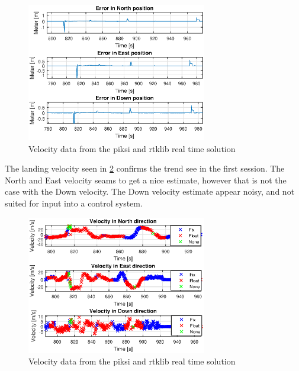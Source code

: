 \begin{figure}[H]
	\centering
		\includegraphics[width=0.7\textwidth]{figs/plots/landingErrorNorthEastDownFlight.eps}
		\caption{Velocity data from the piksi and rtklib real time solution}
		\label{figure:landingErrorNorthEastDownFlight}
\end{figure}
The landing velocity seen in \ref{figure:landingVelocity} confirms the trend see in the first session. The North and East velocity seams to get a nice estimate, however that is not the case with the Down velocity. The Down velocity estimate appear noisy, and not suited for input into a control system. 
\begin{figure}[H]
	\centering
		\includegraphics[width=0.7\textwidth]{figs/plots/landingVelocity.eps}
		\caption{Velocity data from the piksi and rtklib real time solution}
		\label{figure:landingVelocity}
\end{figure}
\cleardoublepage